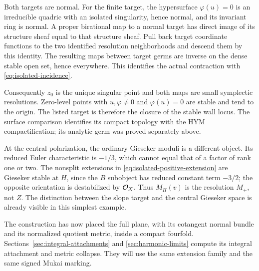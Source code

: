 Both targets are normal. For the finite target, the hypersurface
$\varphi(u)=0$ is an irreducible quadric with an isolated
singularity, hence normal, and its invariant ring is normal.
A proper birational map to a normal target has direct image
of its structure sheaf equal to that structure sheaf. Pull
back target coordinate functions to the two identified
resolution neighborhoods and descend them by this identity.
The resulting maps between target germs are inverse on the
dense stable open set, hence everywhere. This identifies the
actual contraction with \eqref{eq:isolated-incidence}.

Consequently $z_0$ is the unique singular point and both maps
are small symplectic resolutions. Zero-level points with
$u,\varphi\ne0$ and $\varphi(u)=0$ are stable and tend to
the origin. The listed target is therefore the closure of
the stable wall locus. The surface comparison
\cite[Theorem~4.11 and Corollary~4.15]{gstw} identifies its
compact topology with the HYM compactification; its analytic
germ was proved separately above.

At the central polarization, the ordinary Gieseker moduli
is a different object. Its reduced Euler characteristic is
$-1/3$, which cannot equal that of a factor of rank one or
two. The nonsplit extensions in
\eqref{eq:isolated-positive-extension} are Gieseker stable
at $H$, since the $B$ subobject has reduced constant term
$-3/2$; the opposite orientation is destabilized by
$\mathcal O_X$. Thus $M_H(v)$ is the resolution $M_+$, not $Z$.
The distinction between the slope target and the central
Gieseker space is already visible in this simplest example.

The construction has now placed the full plane, with its
cotangent normal bundle and its normalized quotient metric,
inside a compact fourfold. Sections~\ref{sec:integral-attachments}
and \ref{sec:harmonic-limits} compute its integral attachment
and metric collapse. They will use the same extension family
and the same signed Mukai marking.

